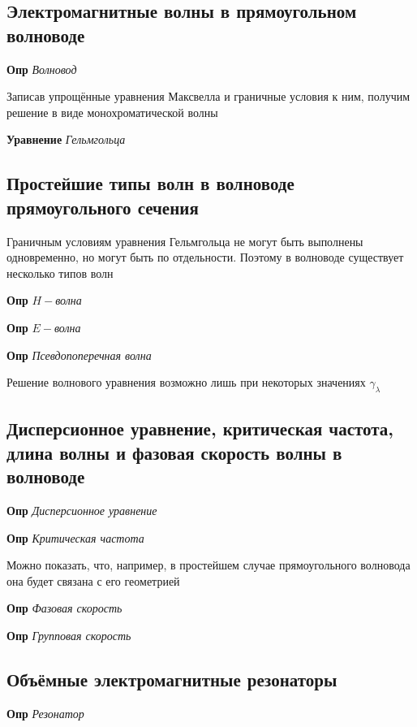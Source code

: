 \documentclass[a4paper, 14pt]{article}
\begin{document}
    \subsection{Электромагнитные волны в прямоугольном волноводе}
    
    \textbf{Опр} \textit{Волновод}
    
    Записав упрощённые уравнения Максвелла и граничные условия к ним, получим решение в виде монохроматической волны
    
    \textbf{Уравнение} \textit{Гельмгольца}
    
    \subsection{Простейшие типы волн в волноводе прямоугольного сечения}
    
    Граничным условиям уравнения Гельмгольца не могут быть выполнены одновременно, но могут быть по отдельности.
    Поэтому в волноводе существует несколько типов волн
    
    \textbf{Опр} \textit{$H-$волна}
    
    \textbf{Опр} \textit{$E-$волна}
    
    \textbf{Опр} \textit{Псевдопоперечная волна}
    
    Решение волнового уравнения возможно лишь при некоторых значениях $\gamma_\lambda$
    
    \subsection{Дисперсионное уравнение, критическая частота, длина волны и фазовая скорость волны в волноводе}
    
    \textbf{Опр} \textit{Дисперсионное уравнение}
    
    \textbf{Опр} \textit{Критическая частота}
    
    Можно показать, что, например, в простейшем случае прямоугольного волновода она будет связана с его геометрией
    
    \textbf{Опр} \textit{Фазовая скорость}
    
    \textbf{Опр} \textit{Групповая скорость}
    
    \subsection{Объёмные электромагнитные резонаторы}
    
    \textbf{Опр} \textit{Резонатор}
    
\end{document}

